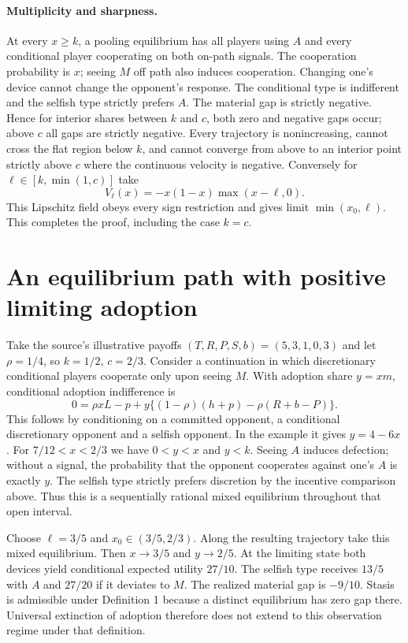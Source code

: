 \documentclass[11pt]{article}
\begin{document}
\paragraph{Multiplicity and sharpness.} At every $x\ge k$, a pooling equilibrium has all players using $A$ and every conditional player cooperating on both on-path signals. The cooperation probability is $x$; seeing $M$ off path also induces cooperation. Changing one's device cannot change the opponent's response. The conditional type is indifferent and the selfish type strictly prefers $A$. The material gap is strictly negative. Hence for interior shares between $k$ and $c$, both zero and negative gaps occur; above $c$ all gaps are strictly negative. Every trajectory is nonincreasing, cannot cross the flat region below $k$, and cannot converge from above to an interior point strictly above $c$ where the continuous velocity is negative. Conversely for $\ell\in[k,\min(1,c)]$ take
\[
  V_\ell(x)=-x(1-x)\max(x-\ell,0).
\]
This Lipschitz field obeys every sign restriction and gives limit $\min(x_0,\ell)$. This completes the proof, including the case $k=c$.

\section{An equilibrium path with positive limiting adoption}
Take the source's illustrative payoffs $(T,R,P,S,b)=(5,3,1,0,3)$ and let $\rho=1/4$, so $k=1/2$, $c=2/3$. Consider a continuation in which discretionary conditional players cooperate only upon seeing $M$. With adoption share $y=xm$, conditional adoption indifference is
\[
 0=\rho xL-p+y\{(1-\rho)(h+p)-\rho(R+b-P)\}.
\]
This follows by conditioning on a committed opponent, a conditional discretionary opponent and a selfish opponent. In the example it gives $y=4-6x$. For $7/12<x<2/3$ we have $0<y<x$ and $y<k$. Seeing $A$ induces defection; without a signal, the probability that the opponent cooperates against one's $A$ is exactly $y$. The selfish type strictly prefers discretion by the incentive comparison above. Thus this is a sequentially rational mixed equilibrium throughout that open interval.

Choose $\ell=3/5$ and $x_0\in(3/5,2/3)$. Along the resulting trajectory take this mixed equilibrium. Then $x\to3/5$ and $y\to2/5$. At the limiting state both devices yield conditional expected utility $27/10$. The selfish type receives $13/5$ with $A$ and $27/20$ if it deviates to $M$. The realized material gap is $-9/10$. Stasis is admissible under Definition 1 because a distinct equilibrium has zero gap there. Universal extinction of adoption therefore does not extend to this observation regime under that definition.
\end{document}

